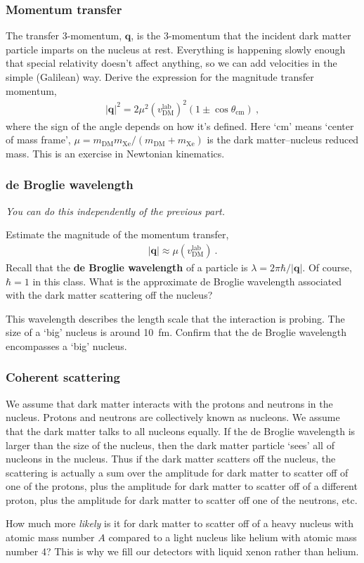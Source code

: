 \documentclass[12pt]{article}
\renewcommand{\vec}[1]{\mathbf{#1}} %
\begin{document}
\subsubsection{Momentum transfer}
The transfer 3-momentum, $\vec q$, is the 3-momentum that the incident dark matter particle imparts on the nucleus at rest. Everything is happening slowly enough that special relativity doesn't affect anything, so we can add velocities in the simple (Galilean) way. Derive the expression for the magnitude transfer momentum, 
\begin{align}
	|\vec q|^2 = 2\mu^2 (v_\text{DM}^\text{lab})^2 (1\pm \cos \theta_\text{cm}) \ ,
\end{align}
where the sign of the angle depends on how it's defined. Here `cm' means `center of mass frame', $\mu = m_{\text{DM}}m_{\text{Xe}}/(m_{\text{DM}}+m_{\text{Xe}})$ is the dark matter--nucleus reduced mass. This is an exercise in Newtonian kinematics.


\subsubsection{de Broglie wavelength}

\emph{You can do this independently of the previous part.} 

Estimate the magnitude of the momentum transfer,
\begin{align}
	|\vec q| \approx \mu (v_\text{DM}^\text{lab}) \ .
\end{align}
Recall that the \textbf{de Broglie wavelength} of a particle is $\lambda = 2\pi\hbar/|\vec q|$. Of course, $\hbar = 1$ in this class. What is the approximate de Broglie wavelength associated with the dark matter scattering off the nucleus?

This wavelength describes the length scale that the interaction is probing. The size of a `big' nucleus is around 10~fm. Confirm that the de Broglie wavelength encompasses a `big' nucleus.

\subsubsection{Coherent scattering}

We assume that dark matter interacts with the protons and neutrons in the nucleus. Protons and neutrons are collectively known as nucleons. We assume that the dark matter talks to all nucleons equally.
If the de Broglie wavelength is larger  than the size of the nucleus, then the dark matter particle `sees' all of nucleons in the nucleus. Thus if the dark matter scatters off the nucleus, the scattering is actually a sum over the amplitude for dark matter to scatter off of one of the protons, plus the amplitude for dark matter to scatter off of a different proton, plus the amplitude for dark matter to scatter off one of the neutrons, etc.

How much more \emph{likely} is it for dark matter to scatter off of a heavy nucleus with atomic mass number $A$ compared to a light nucleus like helium with atomic mass number 4? This is why we fill our detectors with liquid xenon rather than helium.
\end{document}
